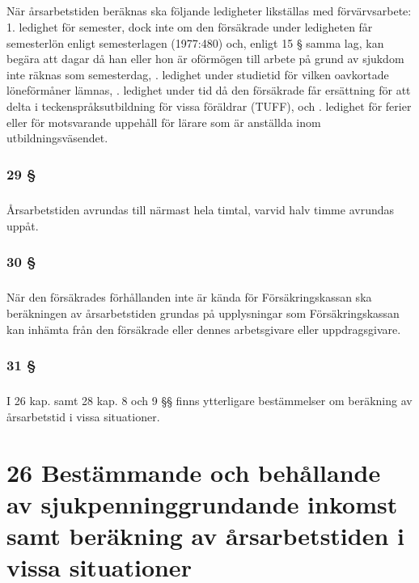 \documentclass[a4paper,notitlepage,openany,10pt]{book}
\begin{document}
\paragraph*{}
När årsarbetstiden beräknas ska följande ledigheter likställas med förvärvsarbete: 1. ledighet för semester, dock inte om den försäkrade under ledigheten får semesterlön enligt semesterlagen (1977:480) och, enligt 15 § samma lag, kan begära att dagar då han eller hon är oförmögen till arbete på grund av sjukdom inte räknas som semesterdag,
. ledighet under studietid för vilken oavkortade löneförmåner lämnas,
. ledighet under tid då den försäkrade får ersättning för att delta i teckenspråksutbildning för vissa föräldrar (TUFF), och
. ledighet för ferier eller för motsvarande uppehåll för lärare som är anställda inom utbildningsväsendet.
\subsection*{29 §}
\paragraph*{}
Årsarbetstiden avrundas till närmast hela timtal, varvid halv timme avrundas uppåt.
\subsection*{30 §}
\paragraph*{}
När den försäkrades förhållanden inte är kända för Försäkringskassan ska beräkningen av årsarbetstiden grundas på upplysningar som Försäkringskassan kan inhämta från den försäkrade eller dennes arbetsgivare eller uppdragsgivare.
\subsection*{31 §}
\paragraph*{}
I 26 kap. samt 28 kap. 8 och 9 §§ finns ytterligare bestämmelser om beräkning av årsarbetstid i vissa situationer.
\chapter*{26 Bestämmande och behållande av sjukpenninggrundande inkomst samt beräkning av årsarbetstiden i vissa situationer}
\end{document}
